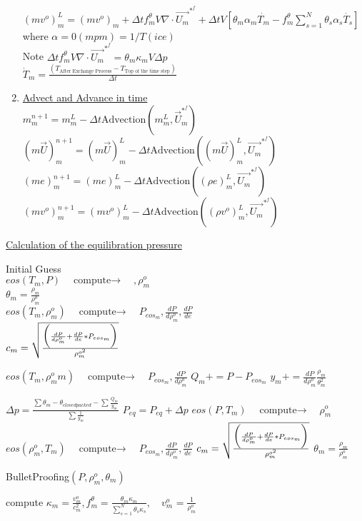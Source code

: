 \documentclass[fleqn]{article}
\newcommand{\SUM}[1]    {\ensuremath{\sum \limits_{{#1}=1}^N }}
\newcommand{\B}[1]      {\biggr{#1}}
\newcommand{\U}         {{\vec{U}}}
\newcommand{\rhoM}      {\ensuremath{\rho^{o}_m}}
\newcommand{\delt}      {\ensuremath{\Delta{t}} }
\newcommand{\f}         {\ensuremath{f^{\theta}_m} }
\newcommand{\sv}[1]     {\ensuremath{v^o_{m_{#1}} }}
\newcommand{\dpdrho}    {\ensuremath{ \frac{dP}{d\rhoM}} }
\newcommand{\compute}   {\ensuremath{\quad{\text{compute}\rightarrow}\quad}}
\begin{document}
\begin{enumerate}
\\
    $(mv^o)^L_m = (mv^o)_m + \delt \f V \nabla \cdot  \vec{U_m}^{*^{f}}
                + \delt V [\theta_m \alpha_m \dot{T_m} 
                - \f \SUM{s} {\theta_s \alpha_s \dot{T_s}}]  $ \quad where $\alpha = 0 (mpm) = 1/T (ice)$  \\
    Note $\delt \f V \nabla \cdot  \vec{U_m}^{*^{f}} = \theta_m \kappa_m V \Delta{p}$\\
   $\dot T_m =\frac{ (T_{\text{After Exchange Process}} - T_{\text{Top of the time step}})}{\delt} $
\item \underline{Advect and Advance in time}\\
$
    m^{n+1}_m     = m^L_m 
                  - \delt\text{Advection}(m^L_m, \U_ m^{*^{f}})$\\
$
    (m \U)^{n+1}_m = (m \U)^L_m 
                   - \delt\text{Advection}((m \U)^L_m, \vec{U_m}^{*^{f}})$\\
$
    (me)^{n+1}_m   = (me)^L_m       
                   - \delt\text{Advection}((\rho  e)^L_m, \vec{U_m}^{*^{f}})$ \\
$
    (mv^o)^{n+1}_m   = (mv^o)^L_m       
                   - \delt\text{Advection}((\rho  v^o)^L_m, \vec{U_m}^{*^{f}})
$

\end{enumerate}
\newpage
\underline{Calculation of the equilibration pressure}

\begin{algorithmic}
\STATE Initial Guess \\
  $eos(T_m, P)  \compute ,\rhoM$ \\
  $\theta_m = \frac{\rho_m}{\rhoM}$  \\
  $eos(T_m, \rhoM)  \compute P_{{eos}_m}, \dpdrho, \frac{dP}{de}$ \\ 
  $c_m =  \sqrt{ \frac {\B{(} \dpdrho + \frac{dP}{de} * P_{{eos}_m } \B{)}} {\rho^{o^2}_m} }$
%
    
      \STATE  $eos(T_m,\rhoM{m})  \compute P_{eos_{m}}, \dpdrho$
      \STATE $Q_m += P- P_{{eos}_m}$
      \STATE $y_m  += \dpdrho \frac{\rho_m}{\theta_m^2}$
    \ENDFOR

    \STATE $\Delta p = \frac{  \sum{\theta_m} - \theta_{closedpacked} - \sum{\frac{Q_m}{y_m}}  }{\sum{\frac{1}{y_m}} } $
    \STATE $P_{eq}=P_{eq}+ \Delta p $
%
      \STATE $ eos(P, T_m) \compute  \rhoM$ 
      \STATE $ eos(\rhoM, T_m) \compute   P_{{eos}_m}, \dpdrho, \frac{dP}{de}$ 
      \STATE $c_m = \sqrt{ \frac {\B{(}\dpdrho + \frac{dP}{de} * P_{{eos}_m } \B{)}} {\rho^{o^2}_m} }$
      \STATE $ \theta_m =  \frac{\rho_m}{\rhoM}$
    \ENDFOR

\ENDWHILE 
\STATE BulletProofing$(P, \rhoM, \theta_m) $

\STATE compute $ \kappa_m = \frac{v^o_m}{c^2_m}, \f = \frac{\theta_m \kappa_m}{\SUM{s}{\theta_s \kappa_s}},  \quad\sv{} = \frac {1}{\rhoM}$
\end{algorithmic}
\end{document}
